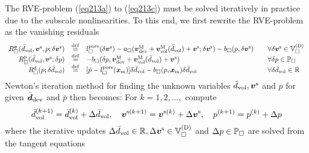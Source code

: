 \documentclass[10pt,a4paper]{article}
\newcommand{\pore}{\mathrm{pore}}
\newcommand{\ded}{\mathrm{d}}
\newcommand{\dep}{\mathrm{p}}
\begin{document}
The RVE-problem (\ref{eq213a}) to (\ref{eq213c}) must be solved iteratively in practice due to the
subscale nonlinearities. To this end, we first rewrite the RVE-problem as the vanishing residuals
\begin{equation}
\begin{array}{rcll}
    R_\Box^{\ta v}(\bar{d}_\vol,\ta{v}^\fluct,p; \delta \ta{v}^\fluct)
    & \defeq &
    l_\Box^\pore(\delta \ta{v}^\fluct) -
    a_\Box(\ta{v}^\macro_\dev+\ta{v}^\macro_\vol(\bar{d}_\vol)+\ta{v}^\fluct;\delta \ta{v}^\fluct) -
    b_\Box(p,\delta\ta{v}^\fluct)
    \quad & \forall \delta \ta{v}^\fluct\in\set{V}_\Box^{(\Dirichlet)}
    \\
    R_\Box^\dep(\bar{d}_\vol,\ta{v}^\fluct; \delta p)
    & \defeq &
    -  b_\Box(\delta p,\ta{v}^\macro_\dev+\ta{v}^\macro_\vol(\bar{d}_\vol)+\ta{v}^\fluct)
    \quad & \forall \delta p\in\set{P}_\Box
    \\
     R_\Box^\ded(p;\delta\bar{d}_\vol)
    & \defeq &
    [\bar{p} - l_\Box^\pore(\ta{x}_\mean)]\delta\bar{d}_\vol -
    b_\Box(p,\ta{x}_\mean)\delta\bar{d}_\vol
    \quad & \forall \delta\bar{d}_\vol  \in \set{R}
\end{array}
\label{eq250b}
\end{equation}
Newton's iteration method for finding the unknown variables
$\bar{d}_{\mathrm{vol}}, \boldsymbol{v}^{\mathrm{s}}$ and $p$ for given $\bar{\boldsymbol{d}}_{\mathrm{dev}}$ and $\bar{p}$ then becomes: For $k=1,2,\ldots,$ compute
\begin{equation}
    \bar{d}_{\mathrm{vol}}^{(k+1)} = \bar{d}_{\mathrm{vol}}^{(k)} + \Delta \bar{d}_{\mathrm{vol}}, \quad
    {\boldsymbol{v}}^{\mathrm{s}(k+1)} = {\boldsymbol{v}}^{\mathrm{s}(k)} + \Delta {\boldsymbol{v}}^{\mathrm{s}}, \quad
    p^{(k+1)} = p^{(k)} + \Delta p
\label{eq251}
\end{equation}
where the iterative updates $\Delta\bar{d}_{\mathrm{vol}}\in\mathbb{R}, \Delta {\boldsymbol{v}}^{\mathrm{s}}\in{\mathbb{V}}_\Box^{(\mathrm{D})}$ and $\Delta p \in{\mathbb{P}}_\Box$ are solved from the tangent equations
\end{document}
